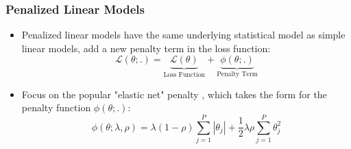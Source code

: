 \documentclass{beamer}
\begin{document}
\begin{frame}
\frametitle{Penalized Linear Models}
\begin{itemize}
	\item Penalized linear models have the same underlying statistical model as simple linear models, add a new penalty term in the loss function:
	\begin{equation}
	\mathcal{L(\theta;.)} = 
	\underset{\text{Loss Function}}{\underbrace{\mathcal{L(\theta)}}} + 
	\underset{\text{Penalty Term}}{\underbrace{\phi(\theta;.)}}
	\end{equation}
	\item Focus on the popular "elastic net" penalty  \citep{zou_regularization_2005}, which takes the form for the penalty function \( \phi(\theta;.) \):
	\begin{equation}
	\phi(\theta;\lambda,\rho) = 
	\lambda(1-\rho) \sum_{j = 1}^{P}|\theta_j| +
	\frac{1}{2} \lambda \rho \sum_{j = 1}^{P}\theta_j^2
	\end{equation}
\end{itemize}
\end{frame}
\end{document}
